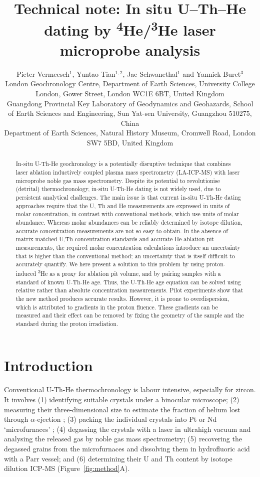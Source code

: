 \documentclass{article}
\title{Technical note: In situ U--Th--He dating by
  \textsuperscript{4}He/\textsuperscript{3}He laser microprobe
  analysis}
\author{Pieter Vermeesch$^1$, Yuntao Tian$^{1,2}$, Jae
  Schwanethal$^{1}$ and Yannick Buret$^3$\\ {London Geochronology
    Centre, Department of Earth Sciences, University College London,
    Gower Street, London WC1E 6BT, United Kingdom}\\ {Guangdong
    Provincial Key Laboratory of Geodynamics and Geohazards, School of
    Earth Sciences and Engineering, Sun Yat-sen University, Guangzhou
    510275, China}\\ {Department of Earth Sciences, Natural History
    Museum, Cromwell Road, London SW7 5BD, United Kingdom} }
\date{}
\begin{document}
\maketitle

\begin{abstract}
  In-situ U-Th-He geochronology is a potentially disruptive technique
  that combines laser ablation inductively coupled plasma mass
  spectrometry (LA-ICP-MS) with laser microprobe noble gas mass
  spectrometry. Despite its potential to revolutionise (detrital)
  thermochronology, in-situ U-Th-He dating is not widely used, due to
  persistent analytical challenges. The main issue is that current
  in-situ U-Th-He dating approaches require that the U, Th and He
  measurements are expressed in units of molar concentration, in
  contrast with conventional methods, which use units of molar
  abundance. Whereas molar abundances can be reliably determined by
  isotope dilution, accurate concentration measurements are not so
  easy to obtain. In the absence of matrix-matched U,Th-concentration
  standards and accurate He-ablation pit measurements, the required
  molar concentration calculations introduce an uncertainty that is
  higher than the conventional method; an uncertainty that is itself
  difficult to accurately quantify. We here present a solution to this
  problem by using proton-induced \textsuperscript{3}He as a proxy for
  ablation pit volume, and by pairing samples with a standard of known
  U-Th-He age. Thus, the U-Th-He age equation can be solved using
  relative rather than absolute concentration measurements.  Pilot
  experiments show that the new method produces accurate results.
  However, it is prone to overdispersion, which is attributed to
  gradients in the proton fluence. These gradients can be measured and
  their effect can be removed by fixing the geometry of the sample and
  the standard during the proton irradiation.
\end{abstract}

\section{Introduction}

Conventional U-Th-He thermochronology is labour intensive, especially
for zircon. It involves (1) identifying suitable crystals under a
binocular microscope; (2) measuring their three-dimensional size to
estimate the fraction of helium lost through $\alpha$-ejection
\citep{farley1996,ketcham2011}; (3) packing the individual crystals
into Pt or Nd `microfurnaces' \citep{house2000}; (4) degassing the
crystals with a laser in ultrahigh vacuum and analysing the released
gas by noble gas mass spectrometry; (5) recovering the degassed grains
from the microfurnaces and dissolving them in hydrofluoric acid with a
Parr vessel; and (6) determining their U and Th content by isotope
dilution ICP-MS (Figure~\ref{fig:method}A).\medskip
\end{document}
